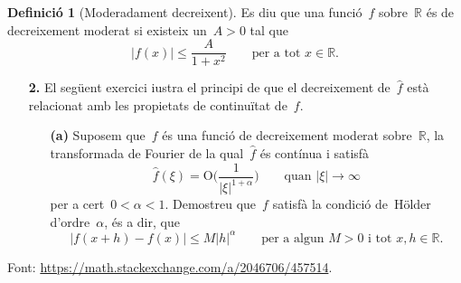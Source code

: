\documentclass[a4paper]{article}
\theoremstyle{definition}
\newtheorem{definition}{Definició}
\newcommand{\abs}[1]{\lvert{#1}\rvert}
\begin{document}
\begin{definition}[Moderadament decreixent]
    Es diu que una funció~\(f\) sobre~\(\mathbb{R}\) és de decreixement moderat
    si existeix un~\(A>0\) tal que
    \[
        \abs{f(x)} \leq \frac{A}{1+x^{2}}
        \qquad\text{per a tot }x\in\mathbb{R}.
    \]
\end{definition}

\begin{enumerate}
    \item[\textbf{2.}] El següent exercici i{\lgem}ustra el principi de que el
        decreixement de~\(\widehat{f}\) està relacionat amb les propietats de
        continuïtat de~\(f\).
        \begin{enumerate}
            \item[\textbf{(a)}] Suposem que~\(f\) és una funció de decreixement
                moderat sobre~\(\mathbb{R}\), la transformada de Fourier de la
                qual~\(\widehat{f}\) és contínua i satisfà
                \[
                    \widehat{f}(\xi) =
                    \mathrm{O}\biggl(\frac{1}{\abs{\xi}^{1+\alpha}}\biggr)
                    \qquad\text{quan } \abs{\xi}\to\infty
                \]
                per a cert~\(0<\alpha<1\). Demostreu que~\(f\) satisfà la
                condició de~H\"older d'ordre~\(\alpha\), és a dir, que
                \[
                    \abs{f(x+h)-f(x)} \leq M\abs{h}^{\alpha}
                    \qquad
                    \text{per a algun } M>0 \text{ i tot } x,h\in\mathbb{R}.
                \]
        \end{enumerate}
\end{enumerate}
Font: \url{https://math.stackexchange.com/a/2046706/457514}.
\end{document}
